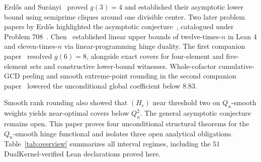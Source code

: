 \documentclass[11pt]{article}
\begin{document}
Erd\H{o}s and Sur\'anyi~\cite{erdossuranyi59} proved $g(3) = 4$ and established their asymptotic lower bound using semiprime cliques around one divisible center. Two later problem papers by Erd\H{o}s highlighted the asymptotic conjecture~\cite{erdos92c,erdos95}, catalogued under Problem 708~\cite{bloom708}. Chen~\cite{chen26} established linear upper bounds of twelve-times-$n$ in Lean 4 and eleven-times-$n$ via linear-programming hinge duality. The first companion paper~\cite{bergstrom26small} resolved $g(6) = 8$, alongside exact covers for four-element and five-element sets and constructive lower-bound witnesses. Whole-cofactor cumulative-GCD peeling and smooth extreme-point rounding in the second companion paper~\cite{bergstrom26asymptotic} lowered the unconditional global coefficient below $8.83$.

Smooth rank rounding also showed that $(H_c)$ near threshold two on $Q_n$-smooth weights yields near-optimal covers below $Q_n^2$. The general asymptotic conjecture remains open. This paper proves four unconditional structural theorems for the $Q_n$-smooth hinge functional and isolates three open analytical obligations. Table~\ref{tab:overview} summarizes all interval regimes, including the $51$ DualKernel-verified Lean declarations proved here.
\end{document}
